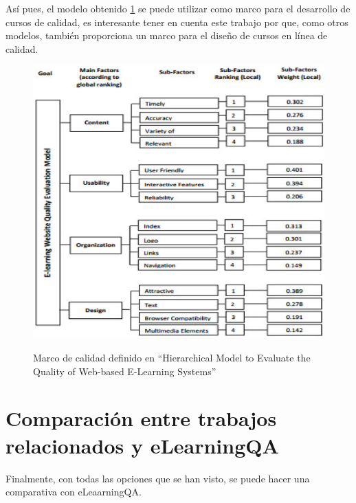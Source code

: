 Así pues, el modelo obtenido \ref{fig:marco-muhammad} se puede utilizar como marco para el desarrollo de cursos de calidad, es interesante tener en cuenta este trabajo por que, como otros modelos, también proporciona un marco para el diseño de cursos en línea de calidad.

\begin{figure}[H]
    \centering
    \includegraphics[width=1\linewidth]{img/modelo-evaluacion-calidad.png}
    \label{fig:marco-muhammad}
    \caption{Marco de calidad definido en ``Hierarchical Model to Evaluate the Quality of Web-based E-Learning Systems''}
\end{figure}


\section{Comparación entre trabajos relacionados y eLearningQA}
Finalmente, con todas las opciones que se han visto, se puede hacer una comparativa con eLeaarningQA.


